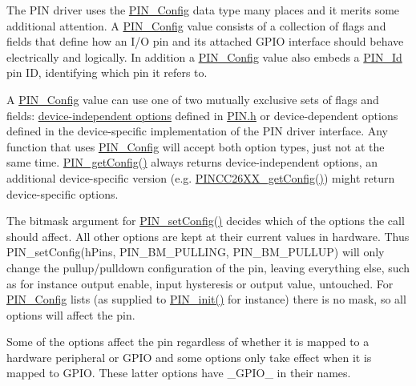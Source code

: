 The P\-I\-N driver uses the \hyperlink{_p_i_n_8h_ae427b7d2925f9b0f3145e455cfdb5841}{P\-I\-N\-\_\-\-Config} data type many places and it merits some additional attention. A \hyperlink{_p_i_n_8h_ae427b7d2925f9b0f3145e455cfdb5841}{P\-I\-N\-\_\-\-Config} value consists of a collection of flags and fields that define how an I/\-O pin and its attached G\-P\-I\-O interface should behave electrically and logically. In addition a \hyperlink{_p_i_n_8h_ae427b7d2925f9b0f3145e455cfdb5841}{P\-I\-N\-\_\-\-Config} value also embeds a \hyperlink{_p_i_n_8h_a9ae8197f460bb76ea09a84f47d09921f}{P\-I\-N\-\_\-\-Id} pin I\-D, identifying which pin it refers to.

A \hyperlink{_p_i_n_8h_ae427b7d2925f9b0f3145e455cfdb5841}{P\-I\-N\-\_\-\-Config} value can use one of two mutually exclusive sets of flags and fields\-: \hyperlink{_p_i_n_8h_PIN_GENERIC_FLAGS}{device-\/independent options} defined in \hyperlink{_p_i_n_8h}{P\-I\-N.\-h} or device-\/dependent options defined in the device-\/specific implementation of the P\-I\-N driver interface. Any function that uses \hyperlink{_p_i_n_8h_ae427b7d2925f9b0f3145e455cfdb5841}{P\-I\-N\-\_\-\-Config} will accept both option types, just not at the same time. \hyperlink{_p_i_n_8h_aed24cb96de8fa957e9f7c05dd239f2f9}{P\-I\-N\-\_\-get\-Config()} always returns device-\/independent options, an additional device-\/specific version (e.\-g. \hyperlink{_p_i_n_c_c26_x_x_8h_aef985455a19581bdb47fff4314fc318b}{P\-I\-N\-C\-C26\-X\-X\-\_\-get\-Config()}) might return device-\/specific options.

The bitmask argument for \hyperlink{_p_i_n_8h_a4b9fbd1a86e63d2f14f679b87f17c857}{P\-I\-N\-\_\-set\-Config()} decides which of the options the call should affect. All other options are kept at their current values in hardware. Thus P\-I\-N\-\_\-set\-Config(h\-Pins, P\-I\-N\-\_\-\-B\-M\-\_\-\-P\-U\-L\-L\-I\-N\-G, P\-I\-N\-\_\-\-B\-M\-\_\-\-P\-U\-L\-L\-U\-P) will only change the pullup/pulldown configuration of the pin, leaving everything else, such as for instance output enable, input hysteresis or output value, untouched. For \hyperlink{_p_i_n_8h_ae427b7d2925f9b0f3145e455cfdb5841}{P\-I\-N\-\_\-\-Config} lists (as supplied to \hyperlink{_p_i_n_8h_a0de1df98a14e6e13b16db414e54472ef}{P\-I\-N\-\_\-init()} for instance) there is no mask, so all options will affect the pin.

Some of the options affect the pin regardless of whether it is mapped to a hardware peripheral or G\-P\-I\-O and some options only take effect when it is mapped to G\-P\-I\-O. These latter options have \-\_\-\-G\-P\-I\-O\-\_\- in their names.

